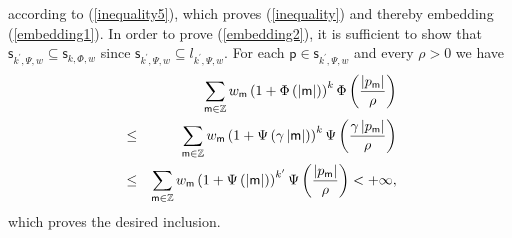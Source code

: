 \documentclass{article}
\begin{document}
according to (\ref{inequality5}), which proves (\ref{inequality}) and
thereby embedding (\ref{embedding1}). In order to prove (\ref{embedding2}),
it is sufficient to show that $\mathsf{s}_{k^{\prime },\Psi ,w}\subseteq 
\mathsf{s}_{k,\Phi ,w}$ since $\mathsf{s}_{k^{\prime },\Psi ,w}\subseteq
l_{k^{\prime },\Psi ,w}$. For each $\mathsf{p}\in \mathsf{s}_{k^{\prime
},\Psi ,w}$ and every $\rho >0$ we have%
\begin{eqnarray*}
&&\sum_{\mathsf{m}\in \mathbb{Z}}w_{\mathsf{m}}\left( 1+\Phi \left(
\left\vert \mathsf{m}\right\vert \right) \right) ^{k}\Phi \left( \frac{%
\left\vert p_{\mathsf{m}}\right\vert }{\rho }\right) \\
&\leq &\sum_{\mathsf{m}\in \mathbb{Z}}w_{\mathsf{m}}\left( 1+\Psi \left(
\gamma \left\vert \mathsf{m}\right\vert \right) \right) ^{k}\Psi \left( 
\frac{\gamma \left\vert p_{\mathsf{m}}\right\vert }{\rho }\right) \\
&\leq &\sum_{\mathsf{m}\in \mathbb{Z}}w_{\mathsf{m}}\left( 1+\Psi \left(
\left\vert \mathsf{m}\right\vert \right) \right) ^{k^{\prime }}\Psi \left( 
\frac{\left\vert p_{\mathsf{m}}\right\vert }{\rho }\right) <+\infty ,
\end{eqnarray*}%
which proves the desired inclusion.
\end{document}
